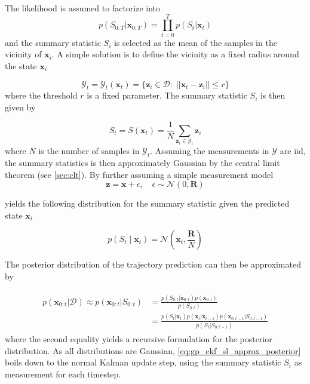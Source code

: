 The likelihood is assumed to factorize into
\begin{equation}
    p(S_{0:T} | \boldsymbol{x}_{0:T}) = \prod_{t=0}^{T} p(S_t | \boldsymbol{x}_t)
\end{equation} and the summary statistic $S_i$ is selected as the mean of the samples in the vicinity of $\boldsymbol{x}_i$. A simple solution is to define the vicinity as a fixed radius around the state $\boldsymbol{x}_i$

\begin{equation}
    \mathcal{Y}_t = \mathcal{Y}_t(\boldsymbol{x}_t) = \{\boldsymbol{z}_i \in \mathcal{D} : \; ||\boldsymbol{x}_t - \boldsymbol{z}_i|| \leq r\}
\end{equation}
where the threshold $r$ is a fixed parameter. The summary statistic $S_i$ is then given by

\begin{equation}
    S_t = S(\boldsymbol{x}_t) = \frac{1}{N} \sum_{\boldsymbol{z}_i \in \mathcal{Y}_t} \boldsymbol{z}_i
\end{equation}
where $N$ is the number of samples in $\mathcal{Y}_t$. Assuming the measurements in $\mathcal{Y}$ are \acrshort{iid}, the summary statistics is then approximately Gaussian by the central limit theorem (see \cref{sec:clt}). By further assuming a simple measurement model
\begin{equation}\label{eq:gp_ekf_sl_z}
    \boldsymbol{z} = \boldsymbol{x} + \epsilon, \quad \epsilon \sim \mathcal{N}(0, \boldsymbol{R})
\end{equation}

yields the following distribution for the summary statistic given the predicted state $\boldsymbol{x}_i$

\begin{equation}
    p(S_t \;| \; \boldsymbol{x}_t) = \mathcal{N}(\boldsymbol{x}_t, \frac{\boldsymbol{R}}{N})
\end{equation}

The posterior distribution of the trajectory prediction can then be approximated by

\begin{align}\label{eq:gp_ekf_sl_approx_posterior}
    \begin{split}
        p(\boldsymbol{x}_{0:t} | \mathcal{D}) \approx p(\boldsymbol{x}_{0:t} | S_{0:t}) &= \frac{p(S_{0:t} | \boldsymbol{x}_{0:t}) p(\boldsymbol{x}_{0:t})}{p(S_{0:t})}\\
        &= \frac{p(S_t | \boldsymbol{x}_t)p(\boldsymbol{x}_t | \boldsymbol{x}_{t-1}) p(\boldsymbol{x}_{0:t-1} | S_{0:t-1})}{p(S_t | S_{0:t-1})}
    \end{split}
\end{align}
where the second equality yields a recursive formulation for the posterior distribution. As all distributions are Gaussian, \cref{eq:gp_ekf_sl_approx_posterior} boils down to the normal Kalman update step, using the summary statistic $S_i$ as measurement for each timestep.

